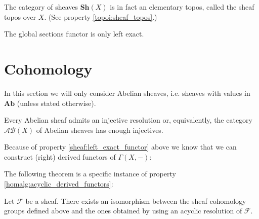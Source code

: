     \begin{property}
        The category of sheaves $\mathbf{Sh}(X)$ is in fact an elementary topos, called the sheaf topos over $X$. (See property \ref{topoi:sheaf_topos}.)
    \end{property}

    \begin{property}\label{sheaf:left_exact_functor}
        The global sections functor is only left exact.
    \end{property}

\section{Cohomology}

    In this section we will only consider Abelian sheaves, i.e. sheaves with values in $\mathbf{Ab}$ (unless stated otherwise).

    \begin{property}
        Every Abelian sheaf admits an injective resolution or, equivalently, the category $\mathcal{AB}(X)$ of Abelian sheaves has enough injectives.
    \end{property}
    Because of property \ref{sheaf:left_exact_functor} above we know that we can construct (right) derived functors of $\Gamma(X,-)$:

    The following theorem is a specific instance of property \ref{homalg:acyclic_derived_functors}:
    \begin{theorem}
        Let $\mathcal{F}$ be a sheaf. There exists an isomorphism between the sheaf cohomology groups defined above and the ones obtained by using an acyclic resolution of $\mathcal{F}$.
    \end{theorem}

